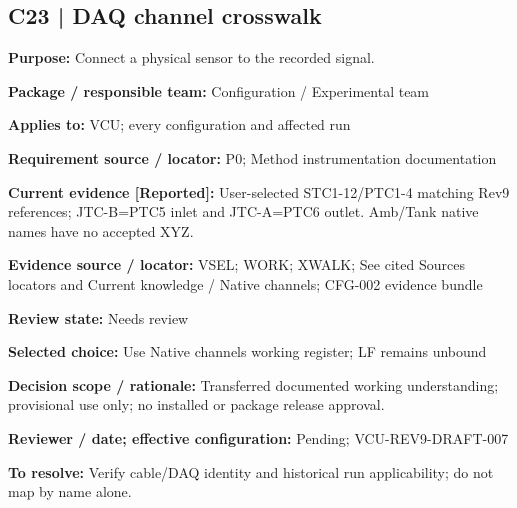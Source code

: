 \documentclass[11pt]{article}
\begin{document}
\par\noindent\begin{minipage}{\textwidth}\small\setlength{\parskip}{2pt}
\subsection*{C23 | DAQ channel crosswalk}
\textbf{Purpose:} Connect a physical sensor to the recorded signal.\par
\textbf{Package / responsible team:} Configuration / Experimental team\par
\textbf{Applies to:} VCU; every configuration and affected run\par
\textbf{Requirement source / locator:} P0; Method instrumentation documentation\par
\textbf{Current evidence [Reported]:} User-selected STC1-12/PTC1-4 matching Rev9 references; JTC-B=PTC5 inlet and JTC-A=PTC6 outlet. Amb/Tank native names have no accepted XYZ.\par
\textbf{Evidence source / locator:} VSEL; WORK; XWALK; See cited Sources locators and Current knowledge / Native channels; CFG-002 evidence bundle\par
\textbf{Review state:} Needs review\par
\textbf{Selected choice:} Use Native channels working register; LF remains unbound\par
\textbf{Decision scope / rationale:} Transferred documented working understanding; provisional use only; no installed or package release approval.\par
\textbf{Reviewer / date; effective configuration:} Pending; VCU-REV9-DRAFT-007\par
\textbf{To resolve:} Verify cable/DAQ identity and historical run applicability; do not map by name alone.\par
\end{minipage}\par\vspace{5pt}
\end{document}

